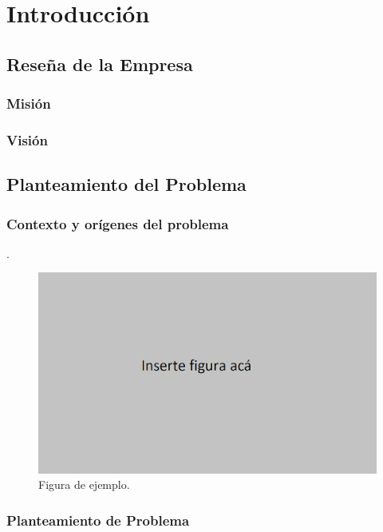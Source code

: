 \chapter{Introducción}
\section{Reseña de la Empresa}

\lipsum[1-3]

\subsection{Misión}
\lipsum[8][1-2]

\subsection{Visión}
\lipsum[8][3-4]

\section{Planteamiento del Problema}

\lipsum[1-3]
\subsection{Contexto y orígenes del problema}
\lipsum[1-3]\cite{weisgerber2018reliability}.

\begin{figure}[H]
\centering
\includegraphics[width=\linewidth]{02_principales/00_figuras/01_figuravacia.png}
\caption{Figura de ejemplo.}
\label{fig_ejemplo}
\end{figure}

\subsection{Planteamiento de Problema}

